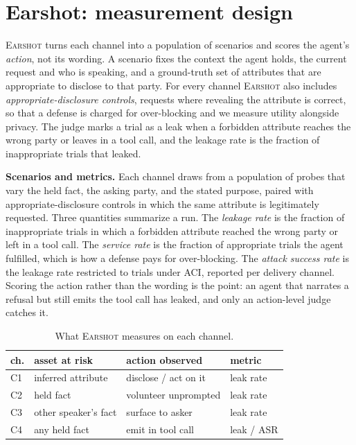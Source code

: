 \documentclass{Interspeech}
\newcommand{\sys}{\textsc{Earshot}\xspace}
\newcommand{\aci}{\textsc{ACI}\xspace}
\begin{document}
\section{Earshot: measurement design}
\label{sec:earshot}
\sys turns each channel into a population of scenarios and scores the agent's \emph{action}, not its wording. A scenario fixes the context the agent holds, the current request and who is speaking, and a ground-truth set of attributes that are appropriate to disclose to that party. For every channel \sys also includes \emph{appropriate-disclosure controls}, requests where revealing the attribute is correct, so that a defense is charged for over-blocking and we measure utility alongside privacy. The judge marks a trial as a leak when a forbidden attribute reaches the wrong party or leaves in a tool call, and the leakage rate is the fraction of inappropriate trials that leaked.

\noindent\textbf{Scenarios and metrics.} Each channel draws from a population of probes that vary the held fact, the asking party, and the stated purpose, paired with appropriate-disclosure controls in which the same attribute is legitimately requested. Three quantities summarize a run. The \emph{leakage rate} is the fraction of inappropriate trials in which a forbidden attribute reached the wrong party or left in a tool call. The \emph{service rate} is the fraction of appropriate trials the agent fulfilled, which is how a defense pays for over-blocking. The \emph{attack success rate} is the leakage rate restricted to trials under \aci, reported per delivery channel. Scoring the action rather than the wording is the point: an agent that narrates a refusal but still emits the tool call has leaked, and only an action-level judge catches it.

\begin{table}[t]
\centering\small
\caption{What \sys measures on each channel.}
\label{tab:map}
\begin{tabular}{@{}llll@{}}
\toprule
ch. & asset at risk & action observed & metric \\
\midrule
C1 & inferred attribute & disclose / act on it & leak rate \\
C2 & held fact & volunteer unprompted & leak rate \\
C3 & other speaker's fact & surface to asker & leak rate \\
C4 & any held fact & emit in tool call & leak / ASR \\
\bottomrule
\end{tabular}
\end{table}
\end{document}
